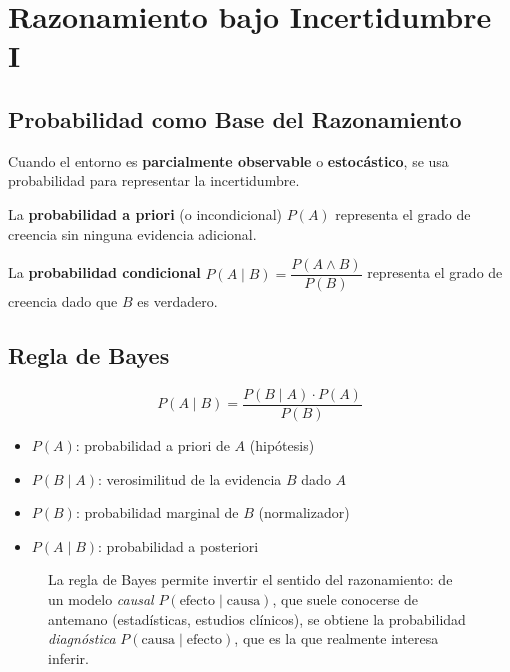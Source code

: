 \section{Razonamiento bajo Incertidumbre I}

\subsection{Probabilidad como Base del Razonamiento}

Cuando el entorno es \textbf{parcialmente observable} o \textbf{estocástico}, se usa probabilidad para representar la incertidumbre.

\begin{definition}
La \textbf{probabilidad a priori} (o incondicional) $P(A)$ representa el grado de creencia sin ninguna evidencia adicional.

La \textbf{probabilidad condicional} $P(A \mid B) = \dfrac{P(A \land B)}{P(B)}$ representa el grado de creencia dado que $B$ es verdadero.
\end{definition}

\subsection{Regla de Bayes}

$$P(A \mid B) = \frac{P(B \mid A) \cdot P(A)}{P(B)}$$

\begin{itemize}
    \item $P(A)$: probabilidad a priori de $A$ (hipótesis)
    \item $P(B \mid A)$: verosimilitud de la evidencia $B$ dado $A$
    \item $P(B)$: probabilidad marginal de $B$ (normalizador)
    \item $P(A \mid B)$: probabilidad a posteriori
\end{itemize}

\begin{figure}[H]
\centering
{}
\caption{La regla de Bayes permite invertir el sentido del razonamiento: de un modelo \textit{causal}
$P(\text{efecto}\mid\text{causa})$, que suele conocerse de antemano (estadísticas, estudios clínicos), se obtiene la
probabilidad \textit{diagnóstica} $P(\text{causa}\mid\text{efecto})$, que es la que realmente interesa inferir.}
\end{figure}

